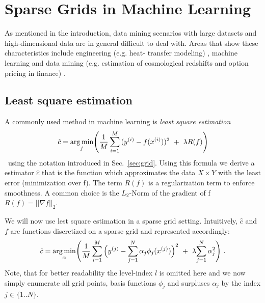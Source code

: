 \section{Sparse Grids in Machine Learning}

As mentioned in the introduction, data mining scenarios with large datasets
and high-dimensional data are in general difficult to deal with.
Areas that show these characteristics include engineering (e.g. heat-
transfer modeling) \cite{disspeh},
machine learning and data mining (e.g. estimation of cosmological redshifts
and option pricing in finance) \cite{disspfl}.
\par
\subsection{Least square estimation}
A commonly used method in machine learning is \emph{least square estimation}
$$\hat{c} = \underset{f}{\text{arg \hspace{-0.5mm}min}}\Bigg(\frac{1}{M}\sum\limits_{i = 1}^{M}{(y^{(i)} - f(x^{(i)}))^2 \ + \ \lambda R(f)} \Bigg)$$ \
using the notation introduced in Sec.~\ref{sec:grid}. Using this formula we
derive a estimator $\hat{c}$ that is the function which approximates the
data $X \times Y$ with the least error (minimization over f).
The term $R(f)$ is a regularization term to enforce smoothness. A common choice
is the $L_2$-Norm of the gradient of f $R(f) = ||\nabla f||_2$.
\par
We will now use lest square estimation in a sparse grid setting. Intuitively,
$\hat{c}$ and $f$ are functions discretized on a sparse grid and represented
accordingly:
$$\hat{c} = \underset{{\alpha}}{\text{arg \hspace{-0.5mm}min}}\Bigg(\frac{1}{M}
\sum\limits_{i = 1}^{M}{\Big(y^{(j)} - {\sum_{j=1}^N{\alpha_j}\phi_j(x^{(j)})}\Big)^2 \ + \
  \lambda {\sum_{j=1}^N{\alpha_j^2}}}\color{black} \Bigg) \ .$$
Note, that for better readability the level-index $l$ is omitted here and
we now simply enumerate all grid points, basis functions $\phi_j$ and surpluses
$\alpha_j$
 by the index $j \in \{1..N\}$.
